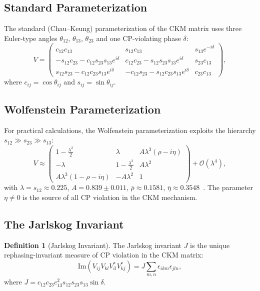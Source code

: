 \documentclass[12pt]{article}
\theoremstyle{definition}
\newtheorem{definition}[theorem]{Definition}
\theoremstyle{remark}
\begin{document}
\subsection{Standard Parameterization}

The standard (Chau--Keung) parameterization of the CKM matrix uses three Euler-type
angles $\theta_{12}$, $\theta_{13}$, $\theta_{23}$ and one CP-violating phase $\delta$:
\begin{equation}
\label{eq:ckm_standard}
V = \begin{pmatrix}
c_{12}c_{13} & s_{12}c_{13} & s_{13}e^{-i\delta} \\
-s_{12}c_{23} - c_{12}s_{23}s_{13}e^{i\delta} & c_{12}c_{23} - s_{12}s_{23}s_{13}e^{i\delta} & s_{23}c_{13} \\
s_{12}s_{23} - c_{12}c_{23}s_{13}e^{i\delta} & -c_{12}s_{23} - s_{12}c_{23}s_{13}e^{i\delta} & c_{23}c_{13}
\end{pmatrix},
\end{equation}
where $c_{ij} = \cos\theta_{ij}$ and $s_{ij} = \sin\theta_{ij}$.

\subsection{Wolfenstein Parameterization}

For practical calculations, the Wolfenstein parameterization exploits the hierarchy
$s_{12} \gg s_{23} \gg s_{13}$:
\begin{equation}
\label{eq:wolfenstein}
V \approx \begin{pmatrix}
1 - \frac{\lambda^2}{2} & \lambda & A\lambda^3(\rho - i\eta) \\
-\lambda & 1 - \frac{\lambda^2}{2} & A\lambda^2 \\
A\lambda^3(1 - \rho - i\eta) & -A\lambda^2 & 1
\end{pmatrix} + \mathcal{O}(\lambda^4),
\end{equation}
with $\lambda = s_{12} \approx 0.225$, $A = 0.839 \pm 0.011$, $\bar{\rho} \approx 0.1581$,
$\bar{\eta} \approx 0.3548$~\cite{PDG2024}. The parameter $\eta \neq 0$ is the source
of all CP violation in the CKM mechanism.

\subsection{The Jarlskog Invariant}

\begin{definition}[Jarlskog Invariant]
\label{def:jarlskog}
The Jarlskog invariant $J$ is the unique rephasing-invariant measure of CP violation
in the CKM matrix:
\begin{equation}
\label{eq:jarlskog}
\text{Im}(V_{ij} V_{kl} V_{il}^* V_{kj}^*) = J \sum_{m,n} \epsilon_{ikm} \epsilon_{jln},
\end{equation}
where $J = c_{12}c_{23}c_{13}^2 s_{12}s_{23}s_{13}\sin\delta$.
\end{definition}
\end{document}
